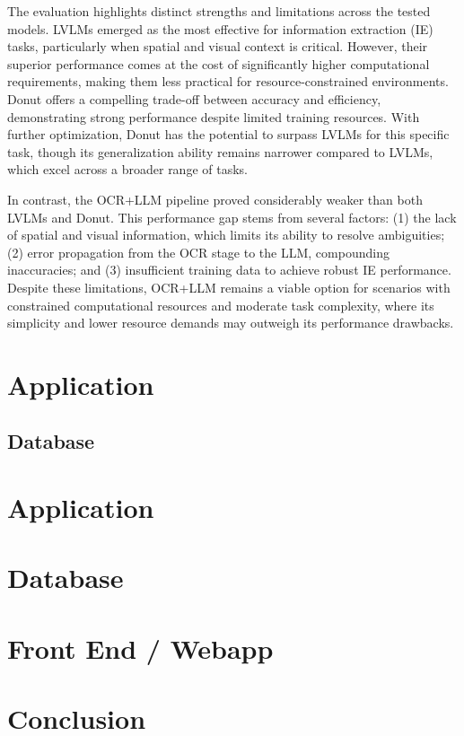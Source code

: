 \documentclass[11pt]{article}
\begin{document}
 The evaluation highlights distinct strengths and limitations across the tested models. LVLMs emerged as the most effective for information extraction (IE) tasks, particularly when spatial and visual context is critical. However, their superior performance comes at the cost of significantly higher computational requirements, making them less practical for resource-constrained environments. Donut offers a compelling trade-off between accuracy and efficiency, demonstrating strong performance despite limited training resources. With further optimization, Donut has the potential to surpass LVLMs for this specific task, though its generalization ability remains narrower compared to LVLMs, which excel across a broader range of tasks.

In contrast, the OCR+LLM pipeline proved considerably weaker than both LVLMs and Donut. This performance gap stems from several factors: (1) the lack of spatial and visual information, which limits its ability to resolve ambiguities; (2) error propagation from the OCR stage to the LLM, compounding inaccuracies; and (3) insufficient training data to achieve robust IE performance. Despite these limitations, OCR+LLM remains a viable option for scenarios with constrained computational resources and moderate task complexity, where its simplicity and lower resource demands may outweigh its performance drawbacks.



\section{Application}

\subsection{Database}



\section{Application}
    \section{Database}
    \section{Front End / Webapp}

\section{Conclusion}
\end{document}
